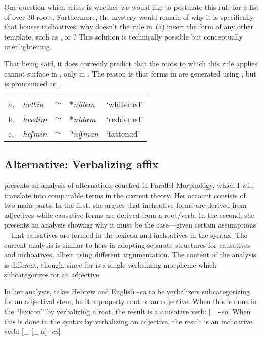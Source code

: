 One question which arises is whether we would like to postulate this rule for a list of over 30 roots. Furthermore, the mystery would remain of why it is specifically {\thif} that houses inchoatives: why doesn't the rule in~(\lastx a) insert the form of any other template, such as {\tkal}, {\tnif} or {\tpie}? This solution is technically possible but conceptually unenlightening.

That being said, it does correctly predict that the roots to which this rule applies cannot surface in {\tnif}, only in {\thit}. The reason is that forms in {\tnif} are generated using {\vz}, but {\vz} is pronounced as {\thif}.
\ex\label{ex:vd:allo-pred}
\begin{tabular}{lllll}
	a. & \emph{helbin} & $\sim$ & *\emph{nilban} & `whitened' \\
	b. & \emph{heedim} & $\sim$ & *\emph{nidam} & `reddened'\\
	c. & \emph{heʃmin} & $\sim$ & \emph{*niʃman} & `fattened'\\
\end{tabular}
\xe

	\subsection{Alternative: Verbalizing affix} \label{vd:others:borer}
\cite{borer91} presents an analysis of {\thif} alternations couched in Parallel Morphology, which I will translate into comparable terms in the current theory. Her account consists of two main parts. In the first, she argues that inchoative forms are derived from adjectives while causative forms are derived from a root/verb. In the second, she presents an analysis showing why it must be the case---given certain assumptions---that causatives are formed in the lexicon and inchoatives in the syntax. The current analysis is similar to hers in adopting separate structures for causatives and inchoatives, albeit using different argumentation. The content of the analysis is different, though, since for \cite{borer91} {\thif} is a single verbalizing morpheme which subcategorizes for an adjective.

In her analysis, \citet[136]{borer91} takes Hebrew {\thif} and English -\emph{en} to be verbalizers subcategorizing for an adjectival stem, be it a property root or an adjective. %
When this is done in the ``lexicon'' by verbalizing a root, the result is a causative verb:
\ex\label{ex:vd:thif-borer-caus}{[}_{}  -\emph{en}]
\xe
When this is done in the syntax by verbalizing an adjective, the result is an inchoative verb:
\ex\label{ex:vd:thif-borer-inch}{[}_{} [_{}  a] -\emph{en}]
\xe

